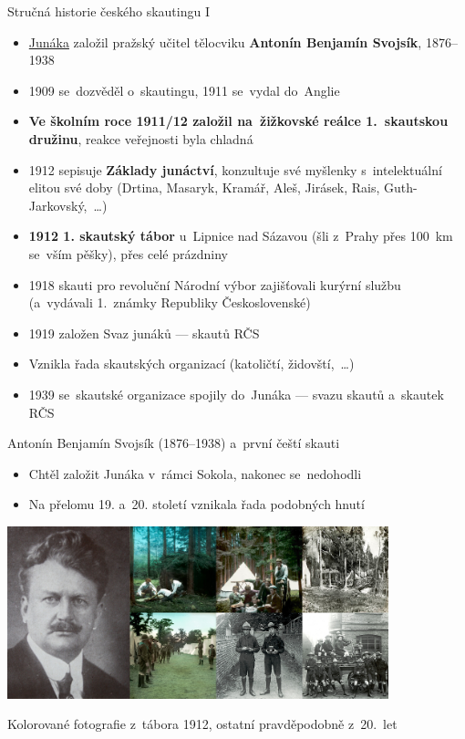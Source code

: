 \documentclass[compress, ucs, xelatex, 11pt, xcolor=dvipsnames, print, aspectratio=169,
	hyperref={
		bookmarks=true,
		unicode=true,
		colorlinks=true,
		pdftitle={Skautska vychovna metoda},
		plainpages=false,
		pdfauthor={Vojtech Zeisek},
		pdfsubject={Skautska vychovna metoda a jeji vyvoj za posledni stoleti a desetileti},
		pdfcreator={XeLaTeX},
		pdfkeywords={Junak, Pedagogika, Skaut, Skauting, Vychovna metoda},
		linkcolor=Red, %
		anchorcolor=ForestGreen, %
		citecolor=ForestGreen, %
		filecolor=ForestGreen, %
		menucolor=ForestGreen, %
		urlcolor=Sepia, %
		pdftex},
	url={hyphens, lowtilde} %
	]{beamer}
\begin{document}
\begin{frame}{Stručná historie českého skautingu I}
	\begin{itemize}
		\item \href{https://www.skaut.cz/skauting/historie/}{Junáka} založil pražský učitel tělocviku \textbf{Antonín Benjamín Svojsík}, 1876--1938
		\item 1909 se~dozvěděl o~skautingu, 1911 se~vydal do~Anglie
		\item \textbf{Ve školním roce 1911/12 založil na~žižkovské reálce 1.~skautskou družinu}, reakce veřejnosti byla chladná
		\item 1912 sepisuje \textbf{Základy junáctví}, konzultuje své myšlenky s~intelektuální elitou své doby (Drtina, Masaryk, Kramář, Aleš, Jirásek, Rais, Guth-Jarkovský,~\ldots)
		\item \textbf{1912 1. skautský tábor} u~Lipnice nad Sázavou (šli z~Prahy přes 100~km se~vším pěšky), přes celé prázdniny
		\item 1918 skauti pro revoluční Národní výbor zajišťovali kurýrní službu (a~vydávali 1.~známky Republiky Československé)
		\item 1919 založen Svaz junáků --- skautů RČS
		\item Vznikla řada skautských organizací (katoličtí, židovští,~\ldots)
		\item 1939 se~skautské organizace spojily do~Junáka --- svazu skautů a~skautek RČS
	\end{itemize}
\end{frame}

\begin{frame}{Antonín Benjamín Svojsík (1876--1938) a~první čeští skauti}
	\begin{itemize}
		\item Chtěl založit Junáka v~rámci Sokola, nakonec se~nedohodli
		\item Na přelomu 19. a~20. století vznikala řada podobných hnutí
	\end{itemize}
	\begin{center}
		\includegraphics[height=5cm]{svojsik_prvni_skauti.jpg}
	\end{center}
	\begin{flushright}
		Kolorované fotografie z~tábora 1912, ostatní pravděpodobně z~20.~let
	\end{flushright}
\end{frame}
\end{document}

